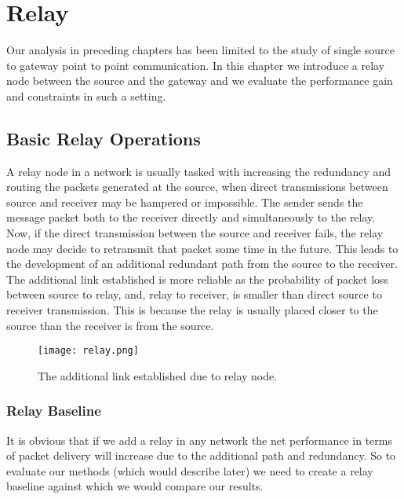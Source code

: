 \chapter{Relay}
\label{relay}
\graphicspath{{Chapter_4/Vector/}{Chapter_4/}}

Our analysis in preceding chapters has been limited to the study of single source to gateway point to point communication. In this chapter we introduce a relay node between the source and the gateway and we evaluate the performance gain and constraints in such a setting. 

\section{Basic Relay Operations}

A relay node in a network is usually tasked with increasing the redundancy and routing the packets generated at the source, when direct transmissions between source and receiver may be hampered or impossible. The sender sends the message packet both to the receiver directly and simultaneously to the relay. Now, if the direct transmission between the source and receiver fails, the relay node may decide to retransmit that packet some time in the future. This leads to the development of an additional redundant path from the source to the receiver. The additional link established is more reliable as the probability of packet loss between source to relay, and, relay to receiver, is smaller than direct source to receiver transmission. This is because the relay is usually placed closer to the source than the receiver is from the source.

\begin{figure}[t]
	\centering
	\texttt{[image: relay.png]}
	\caption{The additional link established due to relay node.}
	\label{relay-fig}
\end{figure}


\subsection{Relay Baseline}

It is obvious that if we add a relay in any network the net performance in terms of packet delivery will increase due to the additional path and redundancy. So to evaluate our methods (which would describe later) we need to create a relay baseline against which we would compare our results.


